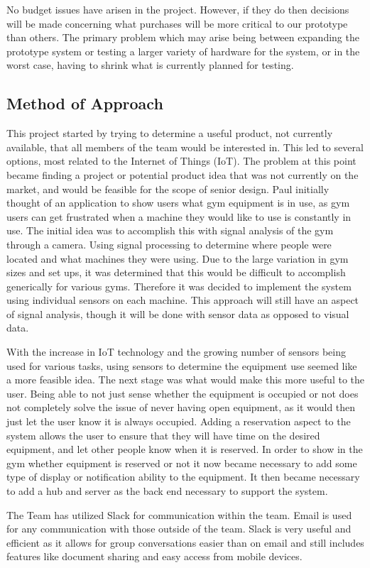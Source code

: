 \documentclass[PPFS.tex]{template/subfiles}
\begin{document}
    No budget issues have arisen in the project. However, if they do then decisions will be made concerning what purchases will be more critical to our prototype than others. The primary problem which may arise being between expanding the prototype system or testing a larger variety of hardware for the system, or in the worst case, having to shrink what is currently planned for testing.  
	
	\subsection{Method of Approach}
	This project started by trying to determine a useful product, not currently available, that all members of the team would be interested in. This led to several options, most related to the Internet of Things (IoT). The problem at this point became finding a project or potential product idea that was not currently on the market, and would be feasible for the scope of senior design. Paul initially thought of an application to show users what gym equipment is in use, as gym users can get frustrated when a machine they would like to use is constantly in use. The initial idea was to accomplish this with signal analysis of the gym through a camera. Using signal processing to determine where people were located and what machines they were using. Due to the large variation in gym sizes and set ups, it was determined that this would be difficult to accomplish generically for various gyms. Therefore it was decided to implement the system using individual sensors on each machine. This approach will still have an aspect of signal analysis, though it will be done with sensor data as opposed to visual data.  
	
	With the increase in IoT technology and the growing number of sensors being used for various tasks, using sensors to determine the equipment use seemed like a more feasible idea. The next stage was what would make this more useful to the user. Being able to not just sense whether the equipment is occupied or not does not completely solve the issue of never having open equipment, as it would then just let the user know it is always occupied. Adding a reservation aspect to the system allows the user to ensure that they will have time on the desired equipment, and let other people know when it is reserved. In order to show in the gym whether equipment is reserved or not it now became necessary to add some type of display or notification ability to the equipment. It then became necessary to add a hub and server as the back end necessary to support the system.
	
	The Team has utilized Slack for communication within the team. Email is used for any communication with those outside of the team. Slack is very useful and efficient as it allows for group conversations easier than on email and still includes features like document sharing and easy access from mobile devices. 
	
\end{document}
